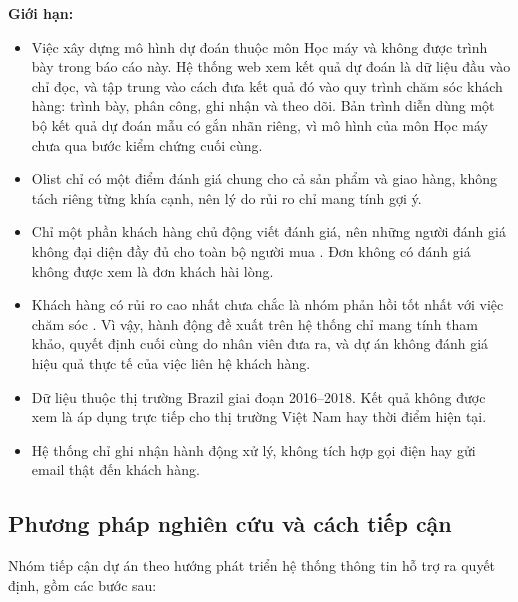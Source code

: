 \textbf{Giới hạn:}

\begin{itemize}
    \item Việc xây dựng mô hình dự đoán thuộc môn Học máy và không được trình bày trong báo cáo này.
    Hệ thống web xem kết quả dự đoán là dữ liệu đầu vào chỉ đọc, và tập trung vào cách đưa kết quả đó
    vào quy trình chăm sóc khách hàng: trình bày, phân công, ghi nhận và theo dõi. Bản trình diễn dùng
    một bộ kết quả dự đoán mẫu có gắn nhãn riêng, vì mô hình của môn Học máy chưa qua bước kiểm chứng
    cuối cùng.
    \item Olist chỉ có một điểm đánh giá chung cho cả sản phẩm và giao hàng, không tách riêng
    từng khía cạnh, nên lý do rủi ro chỉ mang tính gợi ý.
    \item Chỉ một phần khách hàng chủ động viết đánh giá, nên những người đánh giá không đại
    diện đầy đủ cho toàn bộ người mua \parencite{li2008}. Đơn không có đánh giá không được
    xem là đơn khách hài lòng.
    \item Khách hàng có rủi ro cao nhất chưa chắc là nhóm phản hồi tốt nhất với việc chăm sóc
    \parencite{ascarza2018}. Vì vậy, hành động đề xuất trên hệ thống chỉ mang tính tham khảo,
    quyết định cuối cùng do nhân viên đưa ra, và dự án không đánh giá hiệu quả thực tế của
    việc liên hệ khách hàng.
    \item Dữ liệu thuộc thị trường Brazil giai đoạn 2016--2018. Kết quả không được xem là áp
    dụng trực tiếp cho thị trường Việt Nam hay thời điểm hiện tại.
    \item Hệ thống chỉ ghi nhận hành động xử lý, không tích hợp gọi điện hay gửi email thật
    đến khách hàng.
\end{itemize}

\subsection{Phương pháp nghiên cứu và cách tiếp cận}

Nhóm tiếp cận dự án theo hướng phát triển hệ thống thông tin hỗ trợ ra quyết định, gồm
các bước sau:


